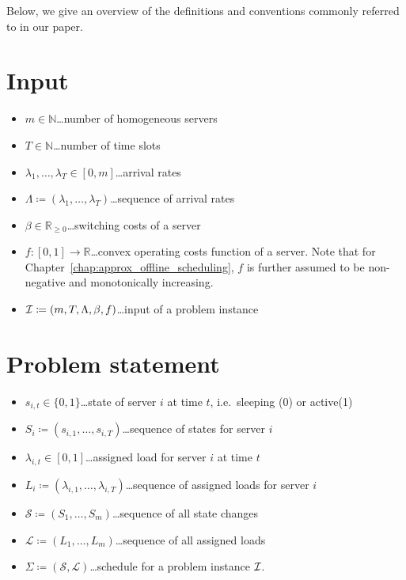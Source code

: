 
Below, we give an overview of the definitions and conventions commonly referred to in our paper.
\section*{Input}
\begin{itemize}
	\item $m\in\mathbb{N}$\ldots number of homogeneous servers
	\item $T\in\mathbb{N}$\ldots number of time slots
	\item $\lambda_1,\ldots,\lambda_{T}\in[0,m]$\ldots arrival rates
	\item $\Lambda\coloneqq(\lambda_1,\ldots,\lambda_T)$\ldots sequence of arrival rates
	\item $\beta\in\mathbb{R}_{\ge 0}$\ldots switching costs of a server
	\item $f:[0,1]\rightarrow\mathbb{R}$\ldots convex operating costs function of a server. Note that for Chapter~\ref{chap:approx_offline_scheduling}, $f$ is further assumed to be non-negative and monotonically increasing.	
	\item $\mathcal{I}\coloneqq(m,T,\Lambda,\beta,f)$\ldots input of a problem instance
\end{itemize}

\section*{Problem statement}
\begin{itemize}
	\item $s_{i,t}\in\{0,1\}$\ldots state of server $i$ at time $t$, i.e.\ sleeping (0) or active(1)
	\item $S_i\coloneqq(s_{i,1},\ldots,s_{i,T})$\ldots sequence of states for server $i$
	\item $\lambda_{i,t}\in[0,1]$\ldots assigned load for server $i$ at time $t$
	\item $L_i\coloneqq(\lambda_{i,1},\ldots,\lambda_{i,T})$\ldots sequence of assigned loads for server $i$
	\item $\mathcal{S}\coloneqq(S_1,\ldots,S_m)$\ldots sequence of all state changes
	\item $\mathcal{L}\coloneqq(L_1,\ldots,L_m)$\ldots sequence of all assigned loads
	\item $\Sigma\coloneqq(\mathcal{S},\mathcal{L})$\ldots schedule for a problem instance $\mathcal{I}$.
\end{itemize}

